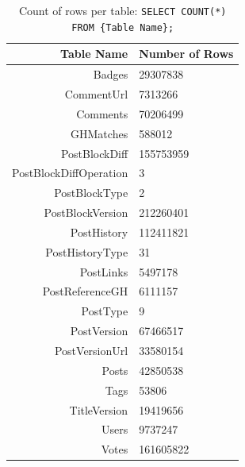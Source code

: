 \documentclass[a4paper,11pt, notitlepage]{report}
\theoremstyle{definition}
\numberwithin{equation}{section}		%
\begin{document}
\begin{table}[ht]
\centering
\begin{tabular}{rl}
\hline
\textbf{Table Name}     & \textbf{Number of Rows}   \\ \hline
Badges                  & 29307838                  \\
CommentUrl              & 7313266                   \\
Comments                & 70206499                  \\
GHMatches               & 588012                    \\
PostBlockDiff           & 155753959                 \\
PostBlockDiffOperation  & 3                         \\
PostBlockType           & 2                         \\
PostBlockVersion        & 212260401                 \\
PostHistory             & 112411821                 \\
PostHistoryType         & 31                        \\
PostLinks               & 5497178                   \\
PostReferenceGH         & 6111157                   \\
PostType                & 9                         \\
PostVersion             & 67466517                  \\
PostVersionUrl          & 33580154                  \\
Posts                   & 42850538                  \\
Tags                    & 53806                     \\
TitleVersion            & 19419656                  \\
Users                   & 9737247                   \\
Votes                   & 161605822                 \\
\end{tabular}
\caption{Count of rows per table: \texttt{SELECT COUNT(*) FROM \{Table Name\};}}
\label{table-counts}
\end{table}
\end{document}
